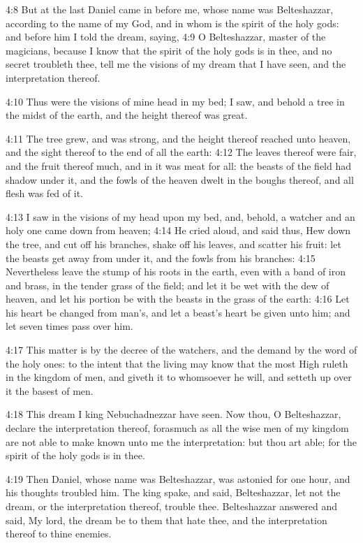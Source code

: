 4:8 But at the last Daniel came in before me, whose name was Belteshazzar, according to the name of my God, and in whom is the spirit of the holy gods: and before him I told the dream, saying, 4:9 O Belteshazzar, master of the magicians, because I know that the spirit of the holy gods is in thee, and no secret troubleth thee, tell me the visions of my dream that I have seen, and the interpretation thereof.

4:10 Thus were the visions of mine head in my bed; I saw, and behold a tree in the midst of the earth, and the height thereof was great.

4:11 The tree grew, and was strong, and the height thereof reached unto heaven, and the sight thereof to the end of all the earth: 4:12 The leaves thereof were fair, and the fruit thereof much, and in it was meat for all: the beasts of the field had shadow under it, and the fowls of the heaven dwelt in the boughs thereof, and all flesh was fed of it.

4:13 I saw in the visions of my head upon my bed, and, behold, a watcher and an holy one came down from heaven; 4:14 He cried aloud, and said thus, Hew down the tree, and cut off his branches, shake off his leaves, and scatter his fruit: let the beasts get away from under it, and the fowls from his branches: 4:15 Nevertheless leave the stump of his roots in the earth, even with a band of iron and brass, in the tender grass of the field; and let it be wet with the dew of heaven, and let his portion be with the beasts in the grass of the earth: 4:16 Let his heart be changed from man's, and let a beast's heart be given unto him; and let seven times pass over him.

4:17 This matter is by the decree of the watchers, and the demand by the word of the holy ones: to the intent that the living may know that the most High ruleth in the kingdom of men, and giveth it to whomsoever he will, and setteth up over it the basest of men.

4:18 This dream I king Nebuchadnezzar have seen. Now thou, O Belteshazzar, declare the interpretation thereof, forasmuch as all the wise men of my kingdom are not able to make known unto me the interpretation: but thou art able; for the spirit of the holy gods is in thee.

4:19 Then Daniel, whose name was Belteshazzar, was astonied for one hour, and his thoughts troubled him. The king spake, and said, Belteshazzar, let not the dream, or the interpretation thereof, trouble thee. Belteshazzar answered and said, My lord, the dream be to them that hate thee, and the interpretation thereof to thine enemies.

